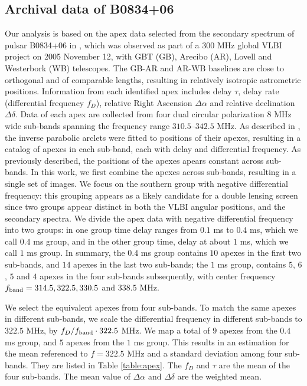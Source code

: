 \documentclass[useAMS,usenatbib]{mn2e}
\begin{document}
\subsection{Archival data of B0834+06}
\label{21}
Our analysis is based on the apex data selected from the secondary
spectrum of pulsar B0834+06 in \citep{2010ApJ...708..232B}, which was
observed as part of a 300 MHz global VLBI project on 2005 November 12, with
GBT (GB), Arecibo (AR), Lovell and Westerbork (WB) telescopes.  The GB-AR and AR-WB
baselines are close to orthogonal and of comparable lengths, resulting
in relatively isotropic astrometric positions.
Information from each identified apex includes delay $\tau$,
delay rate (differential frequency $f_D$), relative Right Ascension
$\Delta\alpha$ and relative declination $\Delta\delta$.
Data of each apex are collected from four dual circular polarization $8$ MHz wide sub-bands spanning the frequency range $310.5$--$342.5$ MHz. 
As described in \citet{2010ApJ...708..232B}, the inverse parabolic
arclets were fitted to positions of their apexes, resulting in a
catalog of apexes in each sub-band, each with delay and differential
frequency.  As previously described, the positions of the apexes
apears constant across sub-bands.  In this work, we first combine the
apexes across sub-bands, resulting in a single set of images.  We focus on
the southern group with negative differential frequency: this
grouping appears as a likely candidate for a double lensing screen
since two groups appear distinct in both the VLBI angular positions, and the
secondary spectra.
We divide the apex data with negative differential frequency into two
groups: in one group time delay ranges from $0.1$ ms to $0.4$ ms,
which we call $0.4$ ms group, and in the other group time, delay at
about $1$ ms, which we call $1$ ms group.  In summary, the
$0.4$ ms group contains $10$ apexes in the first two sub-bands, and $14$ apexes in the last two sub-bands; the $1$ ms group, contains $5$, $6$, $5$ and $4$ apexes in the four sub-bands subsequently, with center frequency $f_{\rm band}=314.5, 322.5, 330.5$ and $ 338.5$ MHz. 

We select the equivalent apexes from four sub-bands. To match the same apexes in different sub-bands, we scale the differential frequency in different sub-bands to $322.5$ MHz, by $f_D/f_{\rm band}\cdot322.5$ MHz. We map
a total of $9$ apexes from the $0.4$ ms group, and $5$ apexes from the $1$ ms
group. This results in an estimation
for the mean referenced to $f=322.5$ MHz and a standard deviation among four sub-bands. They are listed in Table
\ref{table:apex}. The $f_D$ and $\tau$ are the  mean of the four sub-bands. 
The mean value of $\Delta\alpha$ and $\Delta\delta$ are the weighted mean.
\end{document}
